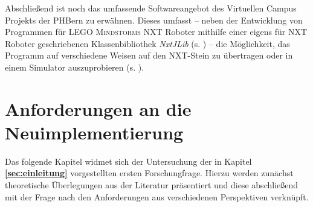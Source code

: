 \documentclass[paper=a4, DIV=calc, BCOR=12mm, twoside=on, onecolumn=on, open = right, titlepage =on, parskip =half-, headsepline = on, footsepline = off, chapterprefix = off, appendixprefix = on, fontsize = 12pt, numbers = noenddot, abstract = on]{scrbook}
\begin{document}
Abschließend ist noch das umfassende Softwareangebot des Virtuellen Campus Projekts der PHBern zu erwähnen. Dieses umfasst -- neben der Entwicklung von Programmen für \textsc{LEGO Mindstorms} NXT Roboter mithilfe einer eigens für NXT Roboter geschriebenen Klassenbibliothek \emph{NxtJLib} (s. \cite{aegidius:16}) -- die Möglichkeit, das Programm auf verschiedene Weisen auf den NXT-Stein zu übertragen oder in einem Simulator auszuprobieren (s. \cite{phbern}). 

\singlespacing
\chapter{Anforderungen an die Neu\-im\-ple\-men\-tie\-rung}
\label{chap:anforderungen}
\onehalfspacing
Das folgende Kapitel widmet sich der Untersuchung der in Kapitel \textbf{\ref{sec:einleitung}} vorgestellten ersten Forschungfrage. Hierzu werden zunächst theoretische Überlegungen aus der Literatur präsentiert und diese abschließend mit der Frage nach den Anforderungen aus verschiedenen Perspektiven verknüpft.
\end{document}
